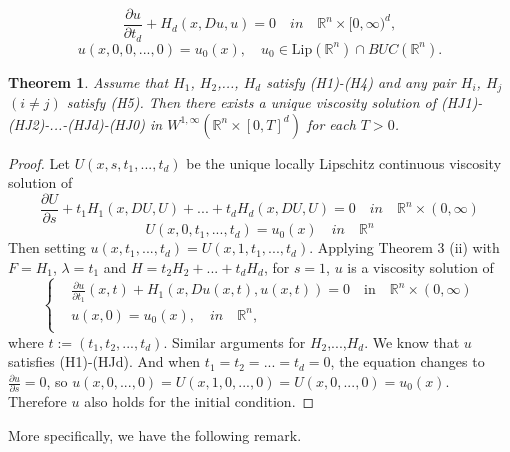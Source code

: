 \documentclass[preprint]{elsarticle}
\newtheorem{result}{\textbf{Theorem}}
\numberwithin{equation}{section}
\begin{document}
\begin{equation}\tag{HJd}
    \frac{\partial u}{\partial t_d} +H_d(x,Du,u)=0 \quad in \quad \mathbb R^n \times [0,\infty)^d,
\end{equation}
\begin{equation}\tag{HJ0}
    u(x,0,0,...,0)=u_0(x),\quad u_0\in \text{Lip}(\mathbb R^n)\cap BUC(\mathbb R^n).
\end{equation}

\begin{result}
    Assume that $H_1$, $H_2$,..., $H_d$ satisfy (H1)-(H4) and any pair $H_i$, $H_j$ $(i \neq j)$ satisfy (H5). Then there exists a unique viscosity solution of (HJ1)-(HJ2)-...-(HJd)-(HJ0) in $W^{1,\infty}(\mathbb R^n \times [0,T]^d)$ for each $T>0$.
\end{result}

\begin{proof}
    Let $U(x,s,t_1,...,t_d)$ be the unique locally Lipschitz continuous viscosity solution of
    \begin{equation*}
        \frac{\partial U}{\partial s}+t_1H_1(x,DU,U)+...+t_dH_d(x,DU,U)=0 \quad in \quad \mathbb R^n \times (0,\infty)
    \end{equation*}
    \begin{equation*}
        U(x,0,t_1,...,t_d)=u_0(x) \quad in \quad \mathbb R^n
    \end{equation*}
    Then setting $u(x,t_1,...,t_d)=U(x,1,t_1,...,t_d)$.
    Applying Theorem 3 (ii) with $F=H_1$, $\lambda=t_1$ and $H=t_2H_2+...+t_dH_d$, for $s=1$, $u$ is a viscosity solution of  
    \begin{equation}
    \left\{
   \begin{aligned}
   & \frac{\partial u}{\partial t_1}(x,t)+H_1(x,Du(x,t),u(x,t))=0\quad \textrm{in}\quad \mathbb R^n\times(0,\infty)
   \\
   &u(x,0)=u_0(x),\quad in \quad \mathbb R^n,
   \\
   \end{aligned}
   \right.
\end{equation}
where $t:=(t_1,t_2,...,t_d)$. Similar arguments for $H_2$,...,$H_d$. We know that $u$ satisfies (H1)-(HJd). And when $t_1=t_2=...=t_d=0$, the equation changes to $\frac{\partial u}{\partial s}=0$, so $u(x,0,...,0)=U(x,1,0,...,0)=U(x,0,...,0)=u_0(x)$. Therefore $u$ also holds for the initial condition.
\end{proof}

More specifically, we have the following remark.
\end{document}
